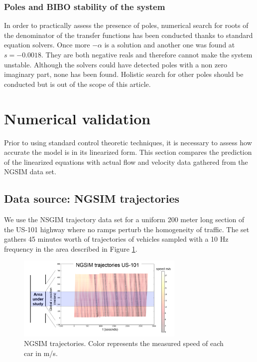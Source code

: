 \documentclass[a4paper, 10pt, conference]{ieeeconf}      %
\begin{document}
\subsubsection{Poles and BIBO stability of the system}
In order to practically assess the presence of poles, numerical search for roots of the denominator of the transfer functions has been conducted thanks to standard equation solvers. Once more $-\alpha$ is a solution and another one was found at $s=-0.0018$. They are both negative reals and therefore cannot make the system unstable. Although the solvers could have detected poles with a non zero imaginary part, none has been found. Holistic search for other poles should be conducted but is out of the scope of this article.


\section{Numerical validation}
Prior to using standard control theoretic techniques, it is necessary to assess how accurate the model is in its linearized form. This section compares the prediction of the linearized equations with actual flow and velocity data gathered from the NGSIM data set.


\subsection{Data source: NGSIM trajectories}
We use the NSGIM trajectory data set for a uniform 200 meter long section of the US-101 highway where no ramps perturb the homogeneity of traffic. The set gathers 45 minutes worth of trajectories of vehicles sampled with a 10 Hz frequency in the area described in Figure \ref{fig:NGSIM-trajectories}.

\begin{figure}
\centering
\includegraphics[width=8cm, trim = 10mm 10mm 10mm 10mm]{US-101_all_traj_low_res_mod}
\protect\caption{NGSIM trajectories. Color represents the measured speed of each
car in m/s.}
\label{fig:NGSIM-trajectories}
\end{figure}
\end{document}
